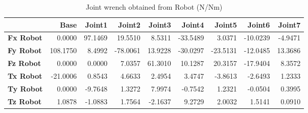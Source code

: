\begin{table}[h!]
	\centering
	\caption{Joint wrench obtained from Robot (N/Nm)}
	\label{wrech_Robot_Pose5}
	\begin{tabular}{|l|r|r|r|r|r|r|r|r|}
		\hline
		\textbf{} & \textbf{Base} & \textbf{Joint1}  & \textbf{Joint2}  & \textbf{Joint3}  & \textbf{Joint4}  & \textbf{Joint5}  & \textbf{Joint6}  & \textbf{Joint7} \\ \hline
		\textbf{Fx Robot}  & 0.0000        & 97.1469        & 19.5510        & 8.5311        & -33.5489        & 3.0371        & -10.0239        & -4.9471 \\ \hline
		\textbf{Fy Robot}  & 108.1750        & 8.4992        & -78.0061        & 13.9228        & -30.0297        & -23.5131        & -12.0485        & 13.3686 \\ \hline
		\textbf{Fz Robot}  & 0.0000        & 0.0000        & 7.0357        & 61.3010        & 10.1287        & 20.3157        & -17.9404        & 8.3572 \\ \hline
		\textbf{Tx Robot}  & -21.0006        & 0.8543        & 4.6633        & 2.4954        & 3.4747        & -3.8613        & -2.6493        & 1.2333 \\ \hline
		\textbf{Ty Robot}  & 0.0000        & -9.7648        & 1.3272        & 7.9974        & -0.7542        & 1.2321        & -0.0504        & 0.3995 \\ \hline
		\textbf{Tz Robot}  & 1.0878        & -1.0883        & 1.7564        & -2.1637        & 9.2729        & 2.0032        & 1.5141        & 0.0910 \\ \hline
	\end{tabular}
\end{table}

